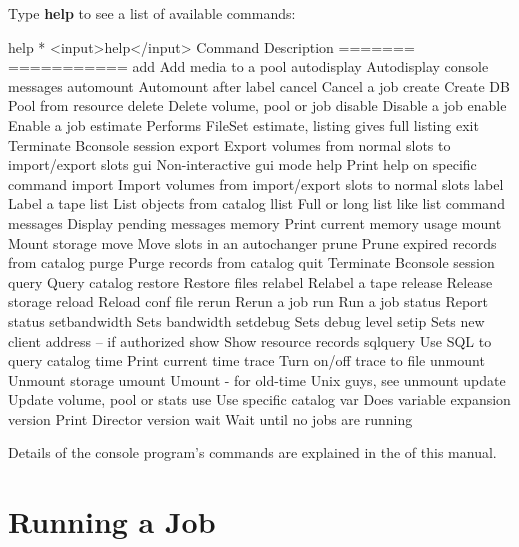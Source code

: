 Type {\bf help} to see a list of available commands:

\begin{bconsole}{help}
* <input>help</input>
  Command       Description
  =======       ===========
  add           Add media to a pool
  autodisplay   Autodisplay console messages
  automount     Automount after label
  cancel        Cancel a job
  create        Create DB Pool from resource
  delete        Delete volume, pool or job
  disable       Disable a job
  enable        Enable a job
  estimate      Performs FileSet estimate, listing gives full listing
  exit          Terminate Bconsole session
  export        Export volumes from normal slots to import/export slots
  gui           Non-interactive gui mode
  help          Print help on specific command
  import        Import volumes from import/export slots to normal slots
  label         Label a tape
  list          List objects from catalog
  llist         Full or long list like list command
  messages      Display pending messages
  memory        Print current memory usage
  mount         Mount storage
  move          Move slots in an autochanger
  prune         Prune expired records from catalog
  purge         Purge records from catalog
  quit          Terminate Bconsole session
  query         Query catalog
  restore       Restore files
  relabel       Relabel a tape
  release       Release storage
  reload        Reload conf file
  rerun         Rerun a job
  run           Run a job
  status        Report status
  setbandwidth  Sets bandwidth
  setdebug      Sets debug level
  setip         Sets new client address -- if authorized
  show          Show resource records
  sqlquery      Use SQL to query catalog
  time          Print current time
  trace         Turn on/off trace to file
  unmount       Unmount storage
  umount        Umount - for old-time Unix guys, see unmount
  update        Update volume, pool or stats
  use           Use specific catalog
  var           Does variable expansion
  version       Print Director version
  wait          Wait until no jobs are running
\end{bconsole}

Details of the console program's commands are explained in the
 of this manual.

\section{Running a Job}
\label{Running}


